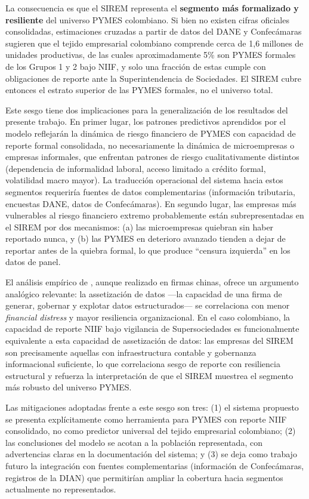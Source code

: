 \documentclass[12pt, letterpaper]{article}
\begin{document}
La consecuencia es que el SIREM representa el \textbf{segmento m\'as formalizado y resiliente} del universo PYMES colombiano. Si bien no existen cifras oficiales consolidadas, estimaciones cruzadas a partir de datos del DANE y Confec\'amaras sugieren que el tejido empresarial colombiano comprende cerca de 1,6 millones de unidades productivas, de las cuales aproximadamente 5\% son PYMES formales de los Grupos 1 y 2 bajo NIIF, y solo una fracci\'on de estas cumple con obligaciones de reporte ante la Superintendencia de Sociedades. El SIREM cubre entonces el estrato superior de las PYMES formales, no el universo total.

Este sesgo tiene dos implicaciones para la generalizaci\'on de los resultados del presente trabajo. En primer lugar, los patrones predictivos aprendidos por el modelo reflejar\'an la din\'amica de riesgo financiero de PYMES con capacidad de reporte formal consolidada, no necesariamente la din\'amica de microempresas o empresas informales, que enfrentan patrones de riesgo cualitativamente distintos (dependencia de informalidad laboral, acceso limitado a cr\'edito formal, volatilidad macro mayor). La traducci\'on operacional del sistema hacia estos segmentos requerir\'ia fuentes de datos complementarias (informaci\'on tributaria, encuestas DANE, datos de Confec\'amaras). En segundo lugar, las empresas m\'as vulnerables al riesgo financiero extremo probablemente est\'an subrepresentadas en el SIREM por dos mecanismos: (a) las microempresas quiebran sin haber reportado nunca, y (b) las PYMES en deterioro avanzado tienden a dejar de reportar antes de la quiebra formal, lo que produce ``censura izquierda'' en los datos de panel.

El an\'alisis emp\'irico de \citet{ZhangZhang2026}, aunque realizado en firmas chinas, ofrece un argumento anal\'ogico relevante: la assetizaci\'on de datos ---la capacidad de una firma de generar, gobernar y explotar datos estructurados--- se correlaciona con menor \textit{financial distress} y mayor resiliencia organizacional. En el caso colombiano, la capacidad de reporte NIIF bajo vigilancia de Supersociedades es funcionalmente equivalente a esta capacidad de assetizaci\'on de datos: las empresas del SIREM son precisamente aquellas con infraestructura contable y gobernanza informacional suficiente, lo que correlaciona sesgo de reporte con resiliencia estructural y refuerza la interpretaci\'on de que el SIREM muestrea el segmento m\'as robusto del universo PYMES.

Las mitigaciones adoptadas frente a este sesgo son tres: (1) el sistema propuesto se presenta expl\'icitamente como herramienta para PYMES con reporte NIIF consolidado, no como predictor universal del tejido empresarial colombiano; (2) las conclusiones del modelo se acotan a la poblaci\'on representada, con advertencias claras en la documentaci\'on del sistema; y (3) se deja como trabajo futuro la integraci\'on con fuentes complementarias (informaci\'on de Confec\'amaras, registros de la DIAN) que permitir\'ian ampliar la cobertura hacia segmentos actualmente no representados.
\end{document}
